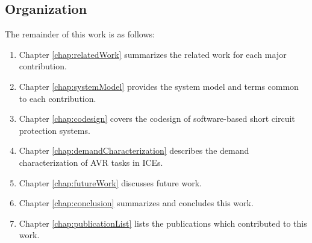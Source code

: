 \subsection{Organization}

The remainder of this work is as follows:

\begin{enumerate}
    \item Chapter \ref{chap:relatedWork} summarizes the related work for each major contribution.
    \item Chapter \ref{chap:systemModel} provides the system model and terms common to each contribution.
    \item Chapter \ref{chap:codesign} covers the codesign of software-based short circuit protection systems.
    \item Chapter \ref{chap:demandCharacterization} describes the demand characterization of AVR tasks in ICEs.
    \item Chapter \ref{chap:futureWork} discusses future work.
    \item Chapter \ref{chap:conclusion} summarizes and concludes this work.
    \item Chapter \ref{chap:publicationList} lists the publications which contributed to this work.
\end{enumerate}